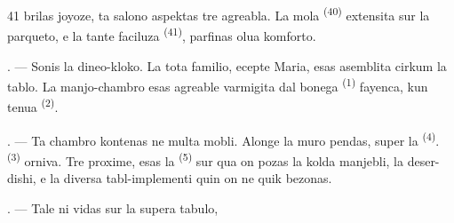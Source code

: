 \begin{VUpage}[43]{41}
\VUcontinue
brilas joyoze, ta salono aspektas tre agreabla.\nl
La mola  \textsuperscript{(40)} extensita sur la parqueto, e\nl
la tante faciluza  \textsuperscript{(41)}, parfinas\nl
olua komforto.

\VUsaut{3.6mm}
\VUsaut{3.0mm}

. --- Sonis la dineo-kloko. La tota familio,\nl
ecepte Maria, esas asemblita cirkum la tablo.\nl
La manjo-chambro esas agreable varmigita dal\nl
bonega  \textsuperscript{(1)} fayenca, kun tenua  \textsuperscript{(2)}.

. --- Ta chambro kontenas ne multa mobli.\nl
Alonge la muro pendas, super la  \textsuperscript{(4)}.\nl
{} \textsuperscript{(3)} orniva. Tre proxime, esas la \cc
{} \textsuperscript{(5)} sur qua on pozas la kolda manjebli,\nl
la deser-dishi, e la diversa tabl-implementi\nl
quin on ne quik bezonas.

. --- Tale ni vidas sur la supera tabulo,
\parplein
\end{VUpage}

